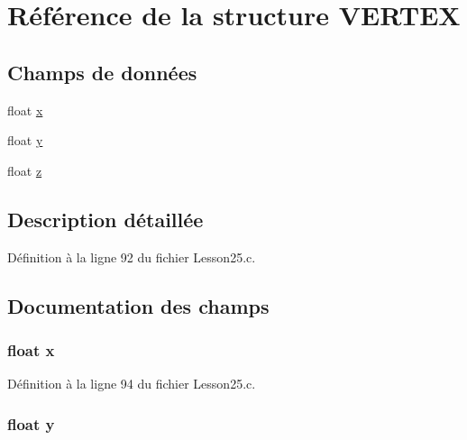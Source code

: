 \hypertarget{struct_v_e_r_t_e_x}{}\section{Référence de la structure V\+E\+R\+T\+E\+X}
\label{struct_v_e_r_t_e_x}
\subsection*{Champs de données}
\begin{DoxyCompactItemize}
\item 
float \hyperlink{struct_v_e_r_t_e_x_ad0da36b2558901e21e7a30f6c227a45e}{x}
\item 
float \hyperlink{struct_v_e_r_t_e_x_aa4f0d3eebc3c443f9be81bf48561a217}{y}
\item 
float \hyperlink{struct_v_e_r_t_e_x_af73583b1e980b0aa03f9884812e9fd4d}{z}
\end{DoxyCompactItemize}


\subsection{Description détaillée}


Définition à la ligne 92 du fichier Lesson25.\+c.



\subsection{Documentation des champs}
\hypertarget{struct_v_e_r_t_e_x_ad0da36b2558901e21e7a30f6c227a45e}{}
\subsubsection[{x}]{\setlength{\rightskip}{0pt plus 5cm}float x}\label{struct_v_e_r_t_e_x_ad0da36b2558901e21e7a30f6c227a45e}


Définition à la ligne 94 du fichier Lesson25.\+c.

\hypertarget{struct_v_e_r_t_e_x_aa4f0d3eebc3c443f9be81bf48561a217}{}
\subsubsection[{y}]{\setlength{\rightskip}{0pt plus 5cm}float y}\label{struct_v_e_r_t_e_x_aa4f0d3eebc3c443f9be81bf48561a217}


